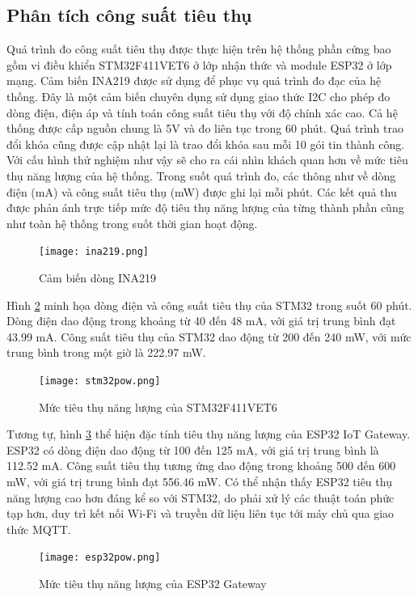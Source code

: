 \subsection{Phân tích công suất tiêu thụ}
Quá trình đo công suất tiêu thụ được thực hiện trên hệ thống phần cứng bao gồm vi điều khiển STM32F411VET6 ở lớp nhận thức và module ESP32 ở lớp mạng.
Cảm biến INA219 được sử dụng để phục vụ quá trình đo đạc của hệ thống. Đây là một cảm biến chuyên dụng sử dụng giao thức I2C cho phép
đo dòng điện, điện áp và tính toán công suất tiêu thụ với độ chính xác cao. Cả hệ thống được cấp nguồn chung là 5V và đo liên tục trong 60 phút. Quá trình trao đổi khóa cũng được cập nhật lại là trao đổi khóa sau mỗi 10 gói tin thành công.
Với cấu hình thử nghiệm như vậy sẽ cho ra cái nhìn khách quan hơn về mức tiêu thụ năng lượng của hệ thống.
Trong suốt quá trình đo, các thông như về dòng điện (mA) và công suất tiêu thụ (mW) được ghi lại mỗi phút. 
Các kết quả thu được phản ánh trực tiếp mức độ tiêu thụ năng lượng của từng thành phần cũng như toàn hệ thống trong suốt thời gian hoạt động.
\begin{figure}[H]
    \centering
    \texttt{[image: ina219.png]}
    \caption{Cảm biến dòng INA219}
    \label{fig:ina219}
\end{figure}

Hình \ref{fig:stm32pow} minh họa dòng điện và công suất tiêu thụ của STM32 trong suốt 60 phút. Dòng điện dao động trong khoảng từ 40 đến 48 mA, với giá trị trung bình đạt 43.99 mA. Công suất tiêu thụ của STM32 dao động từ 200 đến 240 mW, với mức trung bình trong một giờ là 222.97 mW.
\begin{figure}[H]
    \centering
    \texttt{[image: stm32pow.png]}
    \caption{Mức tiêu thụ năng lượng của STM32F411VET6}
    \label{fig:stm32pow}
\end{figure}

Tương tự, hình \ref{fig:esp32pow} thể hiện đặc tính tiêu thụ năng lượng của ESP32 IoT Gateway. ESP32 có dòng điện dao động từ 100 đến 125 mA, với giá trị trung bình là 112.52 mA. 
Công suất tiêu thụ tương ứng dao động trong khoảng 500 đến 600 mW, với giá trị trung bình đạt 556.46 mW. 
Có thể nhận thấy ESP32 tiêu thụ năng lượng cao hơn đáng kể so với STM32, do phải xử lý các thuật toán phức tạp hơn, duy trì kết nối Wi-Fi và truyền dữ liệu liên tục tới máy chủ qua giao thức MQTT.

\begin{figure}[H]
    \centering
    \texttt{[image: esp32pow.png]}
    \caption{Mức tiêu thụ năng lượng của ESP32 Gateway}
    \label{fig:esp32pow}
\end{figure}

